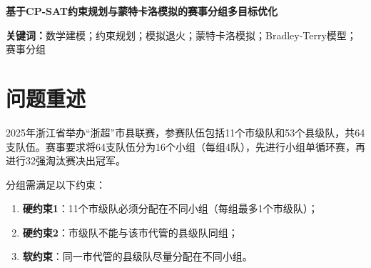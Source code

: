 \documentclass[a4paper,12pt]{article}
\begin{document}
\setcounter{page}{1}

\begin{center}
{\heiti\Large\textbf{基于CP-SAT约束规划与蒙特卡洛模拟的赛事分组多目标优化}}
\end{center}

\vspace{0.5cm}

\begin{abstract}
本文针对2025年浙江省市县联赛（``浙超''）的分组问题，建立了系统的数学模型与优化方案。64支参赛队伍（11个市级队和53个县级队）需分为16个小组，每组4队，并满足严格的行政隶属约束。

针对分组方案生成，采用约束规划（CP-SAT）与模拟退火相结合的方法，生成了6个全部可行的分组方案，所有方案均满足硬约束且软约束违反次数为0。针对抽签方案，设计了分层随机抽签、合法性验签与必要重抽流程，并通过10000次蒙特卡洛模拟验证：硬约束可行率为100\%，平均软约束违反次数为$1.53\pm1.40$。针对比赛地点选择，采用候选场馆筛选与贪心分配算法，确定8个比赛城市，平均旅行距离124.5km，变异系数0.636。针对赛制建议，基于Bradley-Terry实力模型和蒙特卡洛模拟，对比了当前赛制、瑞士轮制和近似双败淘汰制，发现近似双败淘汰制的Gini系数最低（0.4167），且实力分数与夺冠概率的Spearman相关最高（0.9807），公平性表现较优。

本文的方法具有良好的可扩展性和可解释性，可为类似体育赛事分组问题提供参考。
\end{abstract}

\noindent\textbf{关键词：}数学建模；约束规划；模拟退火；蒙特卡洛模拟；Bradley-Terry模型；赛事分组

\newpage


\section{问题重述}

2025年浙江省举办``浙超''市县联赛，参赛队伍包括11个市级队和53个县级队，共64支队伍。赛事要求将64支队伍分为16个小组（每组4队），先进行小组单循环赛，再进行32强淘汰赛决出冠军。

分组需满足以下约束：
\begin{enumerate}
    \item \textbf{硬约束1}：11个市级队必须分配在不同小组（每组最多1个市级队）；
    \item \textbf{硬约束2}：市级队不能与该市代管的县级队同组；
    \item \textbf{软约束}：同一市代管的县级队尽量分配在不同小组。
\end{enumerate}
\end{document}
